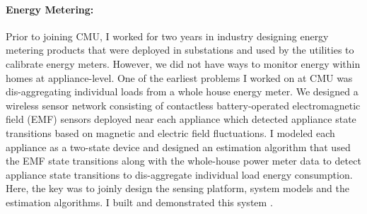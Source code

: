 \documentclass[10pt]{article}
\begin{document}
\paragraph{Energy Metering: }
Prior to joining CMU, I worked for two years in industry designing energy metering products that were deployed in substations and used by the utilities to calibrate energy meters.
However, we did not have ways to monitor energy within homes at appliance-level. One of the earliest problems I worked on at CMU was dis-aggregating individual loads from a whole house energy meter. %
We designed a wireless sensor network consisting of contactless battery-operated electromagnetic field (EMF) sensors deployed near each appliance which detected appliance state transitions based on magnetic and electric field fluctuations. I modeled each appliance as a two-state device %
and designed an estimation algorithm that used the EMF state transitions along with the whole-house power meter data to detect appliance state transitions \cite{rajagopal2013magnetic} to dis-aggregate individual load energy consumption. Here, the key was to joinly design the sensing platform, system models and the estimation algorithms. I built and demonstrated this system \cite{rajagopal2013demo}. 

\end{document}
